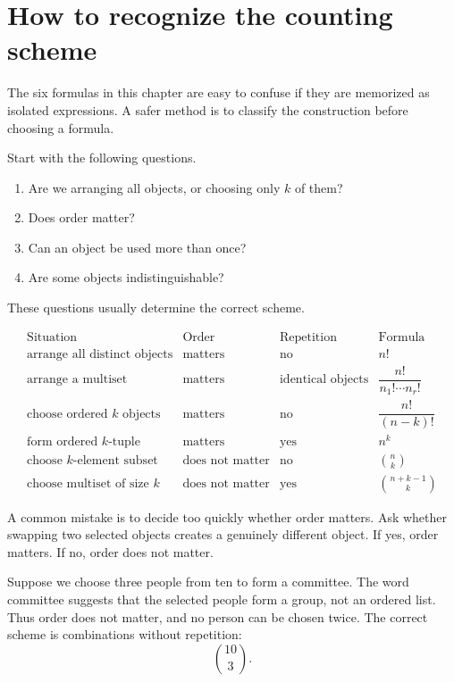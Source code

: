 \section{How to recognize the counting scheme}

The six formulas in this chapter are easy to confuse if they are memorized as isolated expressions. A safer method is to classify the construction before choosing a formula.

Start with the following questions.

\begin{enumerate}
    \item Are we arranging all objects, or choosing only \(k\) of them?
    \item Does order matter?
    \item Can an object be used more than once?
    \item Are some objects indistinguishable?
\end{enumerate}

These questions usually determine the correct scheme.

\[
\begin{array}{c|c|c|c}
\text{Situation} & \text{Order} & \text{Repetition} & \text{Formula} \\
\hline
\text{arrange all distinct objects} & \text{matters} & \text{no} & n! \\
\text{arrange a multiset} & \text{matters} & \text{identical objects} & \dfrac{n!}{n_1!\cdots n_r!} \\
\text{choose ordered }k\text{ objects} & \text{matters} & \text{no} & \dfrac{n!}{(n-k)!} \\
\text{form ordered }k\text{-tuple} & \text{matters} & \text{yes} & n^k \\
\text{choose }k\text{-element subset} & \text{does not matter} & \text{no} & \binom{n}{k} \\
\text{choose multiset of size }k & \text{does not matter} & \text{yes} & \binom{n+k-1}{k}
\end{array}
\]

\begin{remarkbox}
A common mistake is to decide too quickly whether order matters. Ask whether swapping two selected objects creates a genuinely different object. If yes, order matters. If no, order does not matter.
\end{remarkbox}

\begin{examplebox}
Suppose we choose three people from ten to form a committee. The word committee suggests that the selected people form a group, not an ordered list. Thus order does not matter, and no person can be chosen twice. The correct scheme is combinations without repetition:
\[
\binom{10}{3}.
\]
\end{examplebox}

